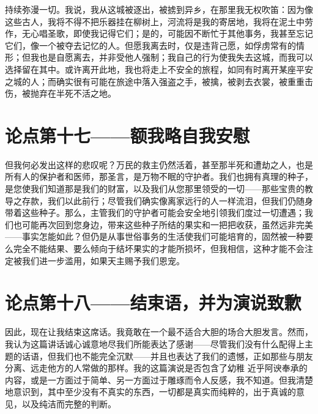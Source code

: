 持续弥漫一切。我说，我从这城被逐出，被掳到异乡，在那里我无权吹笛：因为像这些古人，我将不得不把乐器挂在柳树上，河流将是我的寄居地，我将在泥土中劳作，无心唱圣歌，即使我记得它们；是的，可能因不断忙于其他事务，我甚至忘记它们，像一个被夺去记忆的人。但愿我离去时，仅是违背己愿，如俘虏常有的情形；但我也是自愿离去，并非受他人强制；我自己的行为使我失去这城，而我可以选择留在其中。或许离开此地，我也将走上不安全的旅程，如同有时离开某座平安之城的人；而确实很有可能在旅途中落入强盗之手，被擒，被剥去衣裳，被重重击伤，被抛弃在半死不活之地。\par


\section{论点第十七——额我略自我安慰}

但我何必发出这样的悲叹呢？万民的救主仍然活着，甚至那半死和遭劫之人，也是所有人的保护者和医师，那圣言，是万物不眠的守护者。我们也拥有真理的种子，是您使我们知道那是我们的财富，以及我们从您那里领受的一切——那些宝贵的教导之存款，我们以此前行；尽管我们确实像离家远行的人一样流泪，但我们仍随身带着这些种子。那么，主管我们的守护者可能会安全地引领我们度过一切遭遇；我们也可能再次回到您身边，带来这些种子所结的果实和一把把收获，虽然远非完美——事实怎能如此？但仍是从事世俗事务的生活使我们可能培育的，固然被一种要么完全不能结果、要么倾向于结坏果实的才能所损坏，但我相信，这种才能不会注定被我们进一步滥用，如果天主赐予我们恩宠。\par


\section{论点第十八——结束语，并为演说致歉}

因此，现在让我结束这席话。我竟敢在一个最不适合大胆的场合大胆发言。然而，我认为这篇讲话诚心诚意地尽我们所能表达了感谢——尽管我们没有什么配得上主题的话语，但我们也不能完全沉默——并且也表达了我们的遗憾，正如那些与朋友分离、远走他方的人常做的那样。我的这篇演说是否包含了幼稚  近乎阿谀奉承的内容，或是一方面过于简单、另一方面过于雕琢而令人反感，我不知道。但我清楚地意识到，其中至少没有不真实的东西，一切都是真实而纯粹的，出于真诚的意见，以及纯洁而完整的判断。\par


